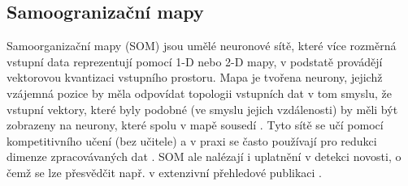 \subsection{Samoogranizační mapy}
Samoorganizační mapy (SOM) \cite{som0} jsou umělé neuronové sítě, které více rozměrná vstupní data reprezentují pomocí 1-D nebo 2-D mapy, v podstatě provádějí vektorovou kvantizaci vstupního prostoru. Mapa je tvořena neurony, jejichž vzájemná pozice by měla odpovídat topologii vstupních dat v tom smyslu, že vstupní vektory, které byly podobné (ve smyslu jejich vzdálenosti) by měli být zobrazeny na neurony, které spolu v mapě sousedí \cite{somS2}. Tyto sítě se učí pomocí kompetitivního učení (bez učitele) a v praxi se často používají pro redukci dimenze zpracovávaných dat \cite{somS}. SOM ale nalézají i uplatnění v detekci novosti, o čemž se lze přesvědčit např. v extenzivní přehledové publikaci \cite{somS2}.  \par
